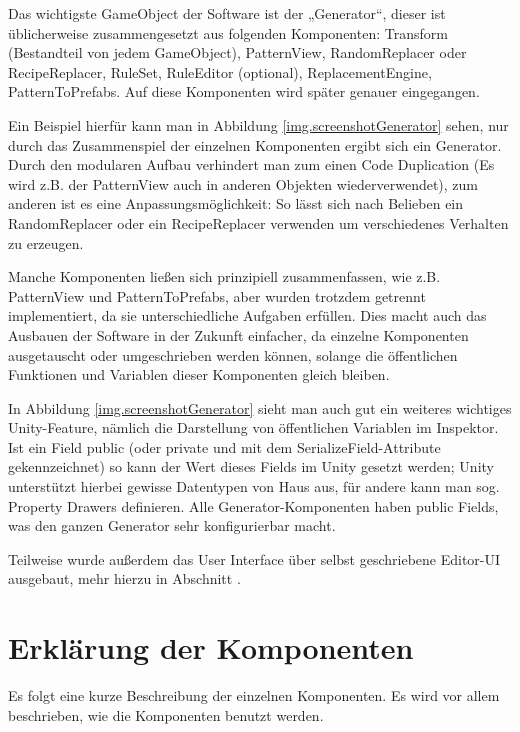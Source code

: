Das wichtigste GameObject der Software ist der „Generator“, dieser ist üblicherweise zusammengesetzt aus folgenden Komponenten: 
Transform (Bestandteil von jedem GameObject), PatternView, RandomReplacer oder RecipeReplacer, RuleSet, RuleEditor (optional), ReplacementEngine, PatternToPrefabs. Auf diese Komponenten wird später  genauer eingegangen.


Ein Beispiel hierfür kann man in Abbildung \ref{img.screenshotGenerator} sehen, nur durch das Zusammenspiel der einzelnen Komponenten ergibt sich ein Generator. Durch den modularen Aufbau verhindert man zum einen Code Duplication (Es wird z.B. der PatternView auch in anderen Objekten wiederverwendet), zum anderen ist es eine Anpassungsmöglichkeit: So lässt sich nach Belieben ein RandomReplacer oder ein RecipeReplacer verwenden um verschiedenes Verhalten zu erzeugen. 

Manche Komponenten ließen sich prinzipiell zusammenfassen, wie z.B. PatternView und PatternToPrefabs, aber wurden trotzdem getrennt implementiert, da sie unterschiedliche Aufgaben erfüllen. Dies macht auch das Ausbauen der Software in der Zukunft einfacher, da einzelne Komponenten ausgetauscht oder umgeschrieben werden können, solange die öffentlichen Funktionen und Variablen dieser Komponenten gleich bleiben.

In Abbildung \ref{img.screenshotGenerator} sieht man auch gut ein weiteres wichtiges Unity-Feature, nämlich die Darstellung von öffentlichen Variablen im Inspektor. Ist ein Field public (oder private und mit dem SerializeField-Attribute gekennzeichnet) so kann der Wert dieses Fields im Unity gesetzt werden; Unity unterstützt hierbei gewisse Datentypen von Haus aus, für andere kann man sog. Property Drawers definieren. Alle Generator-Komponenten haben public Fields, was den ganzen Generator sehr konfigurierbar macht.

Teilweise wurde außerdem das User Interface über selbst geschriebene Editor-UI ausgebaut, mehr hierzu in Abschnitt .

\section{Erklärung der Komponenten}

Es folgt eine kurze Beschreibung der einzelnen Komponenten. Es wird vor allem beschrieben, wie die Komponenten benutzt werden. 

